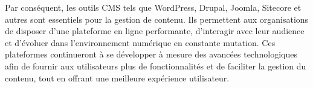 Par conséquent, les outils CMS tels que WordPress, Drupal, Joomla, Sitecore et autres sont essentiels pour la gestion de contenu. Ils permettent aux organisations de disposer d'une plateforme en ligne performante, d'interagir avec leur audience et d'évoluer dans l'environnement numérique en constante mutation. Ces plateformes continueront à se développer à mesure des avancées technologiques afin de fournir aux utilisateurs plus de fonctionnalités et de faciliter la gestion du contenu, tout en offrant une meilleure expérience utilisateur.






